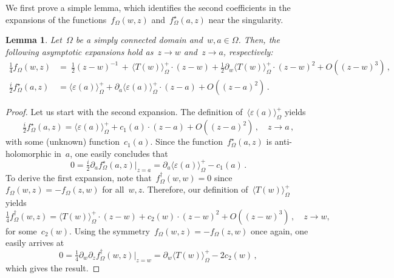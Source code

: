 \documentclass[reqno,11pt,a4paper]{amsart}
\newtheorem{lemma}[proposition]{Lemma}
\theoremstyle{remark}
\newcommand{\f}{f_{\Omega}}
\newcommand{\fstar}{f_{\Omega}^\star}
\newcommand{\freg}{f_{\Omega}^\dag}
\newcommand\Corr[1]{\langle #1 \rangle}
\newcommand\CorrO[2][+]{\Corr{#2}_\Omega^{#1}}
\begin{document}
We first prove a simple lemma, which identifies the second coefficients in the expansions of the functions~$\f(w,z)$ and~$\fstar(a,z)$ near the singularity.

\begin{lemma} \label{lemma:second-coeff}
Let~$\Omega$ be a simply connected domain and~$w,a\in\Omega$. Then, the following asymptotic expansions hold as~$z\to w$ and~$z\to a$, respectively:
\begin{align*}
\tfrac{1}{4}\f (w,z) &= ~\tfrac{1}{2}(z-w)^{-1}\,+\, \langle T (w)\rangle^+_\Omega \cdot (z-w)
+ \tfrac{1}{2}\partial_w\CorrO{T (w)} \cdot (z-w)^2 + O((z-w)^3)\,,\\
\tfrac{i}{2}\fstar (a,z) & = \langle\varepsilon (a) \rangle^+_\Omega + \partial_a\langle\varepsilon (a) \rangle^+_\Omega \cdot (z-a) + O((z-a)^2)\,.
\end{align*}
\end{lemma}
\begin{proof}
Let us start with the second expansion. The definition of~$\CorrO{\varepsilon(a)}$ yields
\[
\tfrac{i}{2}\fstar(a,z)= \langle\varepsilon (a) \rangle^+_\Omega + c_1(a)\cdot (z-a) + O((z-a)^2)\,,\quad z\to a\,,
\]
with some (unknown) function~$c_1(a)$. Since the function~$\fstar(a,z)$ is anti-holomorphic in~$a$, one easily concludes that
\[
0=\tfrac{i}{2}\partial_a\fstar(a,z)\big|_{z=a}=\partial_a\CorrO{\varepsilon(a)} - c_1(a)\,.
\]
To derive the first expansion, note that~$\freg(w,w)=0$ since~$\f(w,z)= -\f(z,w)$ for all~$w,z$. Therefore, our definition of~$\CorrO{T(w)}$ yields
\[
\tfrac{1}{4}\freg(w,z) = \CorrO{T(w)} \cdot (z-w) + c_2(w)\cdot (z-w)^2 + O((z-w)^3)\,,\quad z\to w,
\]
for some~$c_2(w)$. Using the symmetry~$\f(w,z)=-\f(z,w)$ once again, one easily arrives at
\[
0=\tfrac{1}{4}\partial_w\partial_z\freg(w,z)\big|_{z=w} = \partial_w\CorrO{T(w)} - 2c_2(w)\,,
\]
which gives the result.
\end{proof}
\end{document}
